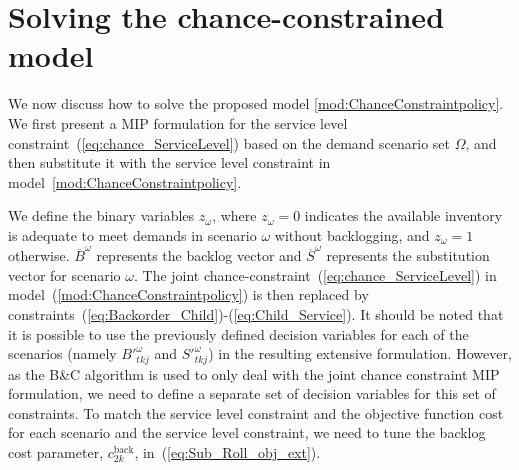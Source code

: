 \documentclass[11pt]{article}
\newcommand{\ti}{t} %
\newcommand{\ka}{k} %
\newcommand{\jey}{j} %
\newcommand{\Es}{S} %
\newcommand{\Zed}{z} %
\newcommand{\m}{\omega} %
\newcommand{\EM}{\Omega} %
\newcommand{\Sc}{\overline{S}}
\newcommand{\Bc}{\overline{B}}
\begin{document}
    
 
  
  \section{Solving the chance-constrained model}
  
  We now discuss how to solve the proposed model \eqref{mod:ChanceConstraintpolicy}.
We first present a MIP formulation for the service level constraint~(\ref{eq:chance_ServiceLevel}) based on the demand scenario set $\EM$, and then substitute it with the service level constraint in model~\eqref{mod:ChanceConstraintpolicy}. 
  
We define the binary variables $\Zed_\m$, where $\Zed_\m=0$ indicates the available inventory is adequate to meet demands in scenario $\m$ without backlogging, and $\Zed_\m=1$ otherwise. $\Bc^ {\m}$ represents the backlog vector and $\Sc^{\m}$ represents the substitution vector for scenario $\m$. The joint chance-constraint~(\ref{eq:chance_ServiceLevel}) in model~(\ref{mod:ChanceConstraintpolicy}) is then replaced by constraints~(\ref{eq:Backorder_Child})-(\ref{eq:Child_Service}). It should be noted that it is possible to use the previously defined decision variables for each of the scenarios (namely $B'^{\m}_{\ti \ka \jey}$ and $\Es'^{\m}_{\ti \ka \jey}$) in the resulting extensive formulation. However, as the B\&C algorithm is used to only deal with the joint chance constraint MIP formulation, we need to define a separate set of decision variables for this set of constraints. To match the service level constraint and the objective function cost for each scenario and the service level constraint, we need to tune the backlog cost parameter, $c^{\text{back}}_{2 \ka}$, in~(\ref{eq:Sub_Roll_obj_ext}).
  
\end{document}
